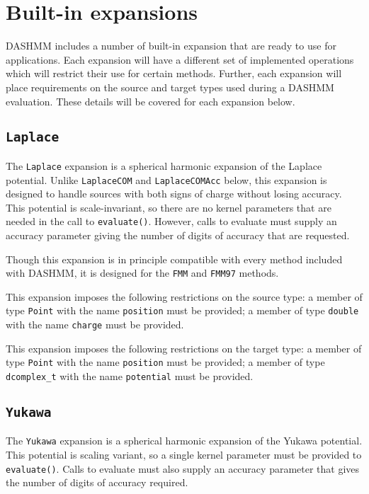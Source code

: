 \documentclass[11pt]{book}
\begin{document}
\section{Built-in expansions}

DASHMM includes a number of built-in expansion that are ready to use for
applications. Each expansion will have a different set of implemented
operations which will restrict their use for certain methods. Further, each
expansion will place requirements on the source and target types used during
a DASHMM evaluation. These details will be covered for each expansion
below.

\subsection{{\tt Laplace}}

The {\tt Laplace} expansion is a spherical harmonic expansion of the Laplace
potential. Unlike {\tt LaplaceCOM} and {\tt LaplaceCOMAcc} below, 
this expansion is
designed to handle sources with both signs of charge without losing accuracy.
This potential is scale-invariant, so there are no kernel parameters that are
needed in the call to {\tt evaluate()}. However, calls to evaluate must supply
an accuracy parameter giving the number of digits of accuracy that are
requested.

Though this expansion is in principle compatible with every method included
with DASHMM, it is designed for the {\tt FMM} and {\tt FMM97} methods.

This expansion imposes the following restrictions on the source type: a
member of type {\tt Point} with the name {\tt position} must be provided; a
member of 
type {\tt double} with the name {\tt charge} must be provided.

This expansion imposes the following restrictions on the target type: a
member of type {\tt Point} with the name {\tt position} must be provided; 
a member of type {\tt dcomplex\_t} with the name {\tt potential}
 must be provided.

\subsection{{\tt Yukawa}}

The {\tt Yukawa} expansion is a spherical harmonic expansion of the Yukawa
potential. This potential is scaling variant, so a single kernel parameter
must be provided to {\tt evaluate()}. Calls to evaluate must also supply an
accuracy parameter that gives the number of digits of accuracy required.
\end{document}
